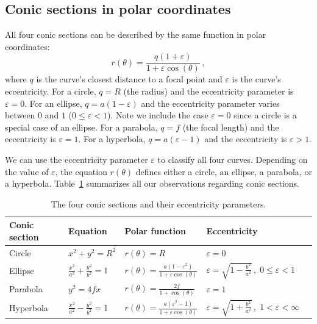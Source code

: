 	\subsection{Conic sections in polar coordinates}

		All four conic sections can be described by the same function in polar coordinates:					
		\[
		  r(\theta) = \frac{q(1+\varepsilon)}{1 + \varepsilon\cos(\theta)}\,,
		\]
		where $q$ is the curve's closest distance to a focal point
		and $\varepsilon$ is the curve's eccentricity.												
		For a circle, $q=R$ (the radius) and the eccentricity parameter is $\varepsilon=0$.
		For an ellipse, $q=a(1-\varepsilon)$ and the eccentricity parameter varies between $0$ and $1$ ($0\leq \varepsilon < 1$).
		Note we include the case $\varepsilon=0$ since a circle is a special case of an ellipse.
		For a parabola, $q=f$ (the focal length) and the eccentricity is $\varepsilon=1$.
		For a hyperbola, $q = a(\varepsilon-1)$ and the eccentricity is $\varepsilon>1$.

		We can use the eccentricity parameter $\varepsilon$ to classify all four curves.
		Depending on the value of $\varepsilon$,
		the equation $r(\theta)$ defines either a circle, an ellipse, a parabola, or a hyperbola.	
		Table~\ref{table:conics} summarizes all our observations regarding conic sections.


		\begin{table}[htb]
		
		\begin{longtable}{lllll} 
		\toprule
		Conic section 	\! 	&  Equation  	\!\!					
		& Polar function	
		&	Eccentricity \!\!\!\!\!\!\!\!\!\!\!\!				\\
		\midrule
		Circle				& $x^2+y^2=R^2$ \; 					& $r(\theta)=R$			& $\varepsilon = 0$								\\
		Ellipse				& $\frac{x^2}{a^2}+\frac{y^2}{b^2}=1$	& $r(\theta)=\frac{a(1-\varepsilon^2)}{1 + \varepsilon\cos(\theta)}$ &	$\varepsilon\!=\!\sqrt{1\!-\!\frac{b^2}{a^2}}\,, \; 0\!\leq\!\varepsilon\!<\!1$\!\!	\\
		Parabola				& $y^2=4fx$						& $r(\theta)=\frac{2f}{1 + \cos(\theta)}$ &	$\varepsilon=1$			 						\\
		Hyperbola			& $\frac{x^2}{a^2}-\frac{y^2}{b^2}=1$	& $r(\theta)=\frac{a(\varepsilon^2-1)}{1 + \varepsilon\cos(\theta)}$ &	$\varepsilon\!=\!\sqrt{1\!+\!\frac{b^2}{a^2}}\,, \; 1\!<\!\varepsilon\!<\!\infty$ \\
		\bottomrule
		\end{longtable}
		\caption{The four conic sections and their eccentricity parameters. \label{table:conics}}
		
		\end{table}


